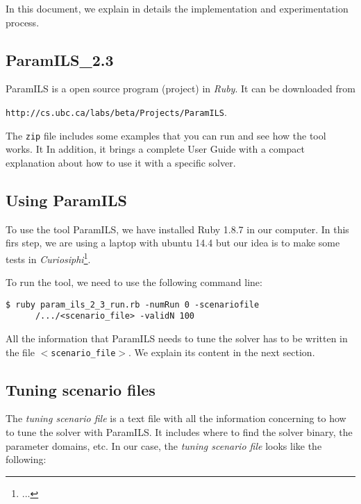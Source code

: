 In this document, we explain in details the implementation and experimentation process.

\subsection{ParamILS\_2.3}

{\sc ParamILS} is a open source program (project) in {\it Ruby}. It can be downloaded from 

\begin{center}
	\texttt{http://cs.ubc.ca/labs/beta/Projects/ParamILS}. 
\end{center}

The \texttt{zip} file includes some examples that you can run and see how the tool works. It In addition, it brings a complete User Guide with a compact explanation about how to use it with a specific solver. 

\subsection{Using ParamILS}

To use the tool {\sc ParamILS}, we have installed Ruby 1.8.7 in our computer. In this firs step, we are using a laptop with {\sc ubuntu 14.4} but our idea is to make some tests in {\it Curiosiphi}\footnote{...}.

To run the tool, we need to use the following command line:

\begin{verbatim}
$ ruby param_ils_2_3_run.rb -numRun 0 -scenariofile 
      /.../<scenario_file> -validN 100
\end{verbatim}


All the information that {\sc ParamILS} needs to tune the solver has to be written in the file \texttt{$<$scenario\_file$>$}. We explain its content in the next section.

\subsection{Tuning scenario files}

The {\it tuning scenario file} is a text file with all the information concerning to how to tune the solver with {\sc ParamILS}. It includes where to find the solver binary, the parameter domains, etc. In our case, the {\it tuning scenario file} looks like the following:

